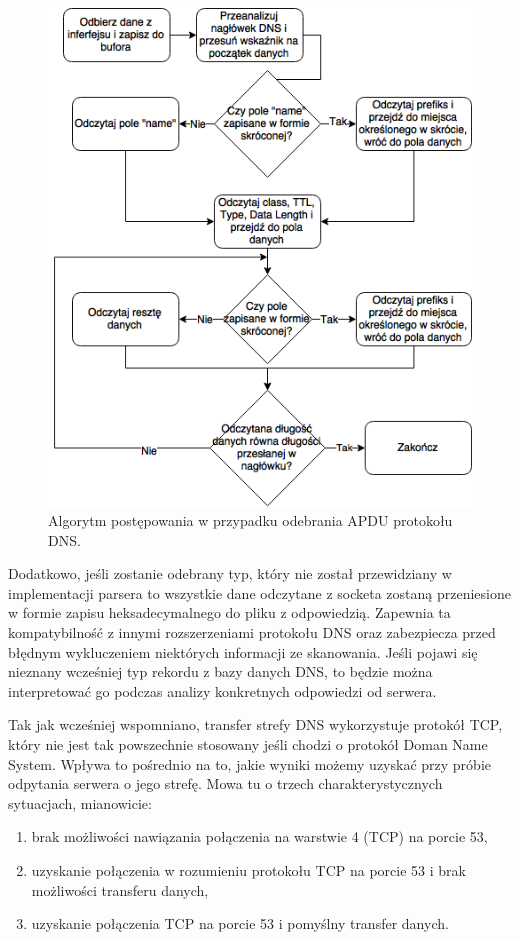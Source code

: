 \begin{figure}[ht]
	\centering
	\includegraphics[width=1.0\textwidth]{image/receiving}
	\caption{Algorytm postępowania w przypadku odebrania APDU protokołu DNS.}
	\label{fig:receiving}
\end{figure}

Dodatkowo, jeśli zostanie odebrany typ, który nie został przewidziany w implementacji parsera to wszystkie dane odczytane z
socketa zostaną przeniesione w formie zapisu heksadecymalnego do pliku z odpowiedzią. Zapewnia ta kompatybilność z innymi
rozszerzeniami protokołu DNS oraz zabezpiecza przed błędnym wykluczeniem niektórych informacji ze skanowania. Jeśli pojawi
się nieznany wcześniej typ rekordu z bazy danych DNS, to będzie można interpretować go podczas analizy konkretnych odpowiedzi
od serwera.

Tak jak wcześniej wspomniano, transfer strefy DNS wykorzystuje protokół TCP, który nie jest tak powszechnie stosowany jeśli chodzi
o protokół Doman Name System. Wpływa to pośrednio na to, jakie wyniki możemy uzyskać przy próbie odpytania serwera o jego strefę. Mowa tu o
trzech charakterystycznych sytuacjach, mianowicie:
\begin{enumerate}
	\item brak możliwości nawiązania połączenia na warstwie 4 (TCP) na porcie 53,
	\item uzyskanie połączenia w rozumieniu protokołu TCP na porcie 53 i brak możliwości transferu danych,
	\item uzyskanie połączenia TCP na porcie 53 i pomyślny transfer danych.
\end{enumerate}

